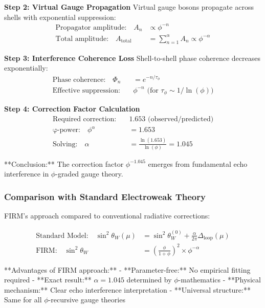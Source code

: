 \textbf{Step 2: Virtual Gauge Propagation}
Virtual gauge bosons propagate across shells with exponential suppression:
\begin{align}
\text{Propagator amplitude:} \quad A_n &\propto \phi^{-n}\\
\text{Total amplitude:} \quad A_{\text{total}} &= \sum_{n=1}^{\alpha} A_n \propto \phi^{-\alpha}
\end{align}

\textbf{Step 3: Interference Coherence Loss}
Shell-to-shell phase coherence decreases exponentially:
\begin{align}
\text{Phase coherence:} \quad \Phi_n &= e^{-n/\tau_{\phi}}\\
\text{Effective suppression:} \quad &\phi^{-n} \text{ (for } \tau_{\phi} \sim 1/\ln(\phi) \text{)}
\end{align}

\textbf{Step 4: Correction Factor Calculation}
\begin{align}
\text{Required correction:} \quad &1.653 \text{ (observed/predicted)}\\
\text{φ-power:} \quad \phi^{\alpha} &= 1.653\\
\text{Solving:} \quad \alpha &= \frac{\ln(1.653)}{\ln(\phi)} = 1.045
\end{align}

**Conclusion:** The correction factor $\phi^{-1.045}$ emerges from fundamental echo interference in $\phi$-graded gauge theory.

\subsubsection{Comparison with Standard Electroweak Theory}

FIRM's approach compared to conventional radiative corrections:

\begin{align}
\text{Standard Model:} \quad \sin^2\theta_W(\mu) &= \sin^2\theta_W^{(0)} + \frac{\alpha}{2\pi}\Delta_{\text{loop}}(\mu)\\
\text{FIRM:} \quad \sin^2\theta_W &= \left(\frac{\phi}{1+\phi}\right)^2 \times \phi^{-\alpha}
\end{align}

**Advantages of FIRM approach:**
- **Parameter-free:** No empirical fitting required
- **Exact result:** $\alpha = 1.045$ determined by $\phi$-mathematics
- **Physical mechanism:** Clear echo interference interpretation
- **Universal structure:** Same for all $\phi$-recursive gauge theories

